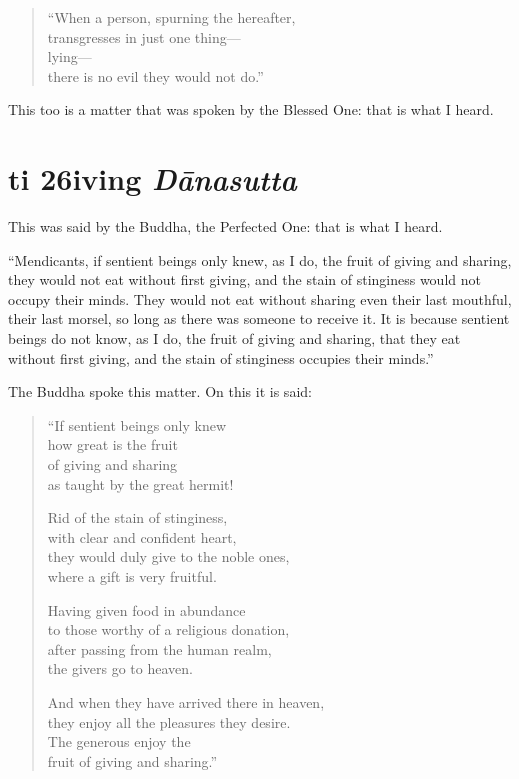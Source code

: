 \documentclass[12pt,openany]{book}%
\newcommand*{\suttatitleacronym}[1]{\smaller[2]{#1}\vspace*{.3em}}
\newcommand*{\suttatitletranslation}[1]{\linebreak{#1}}
\newcommand*{\suttatitleroot}[1]{\linebreak\smaller[2]\itshape{#1}}
\newcommand*{\tocacronym}[1]{\hspace*{-3.3em}{#1}\quad}
\newcommand*{\toctranslation}[1]{#1}
\newcommand*{\tocroot}[1]{(\textit{#1})}
\begin{document}
\begin{verse}%
“When a person, spurning the hereafter, \\
transgresses in just one thing—\\
lying—\\
there is no evil they would not do.” 

%
\end{verse}

This too is a matter that was spoken by the Blessed One: that is what I heard. 

%
\section*{{\suttatitleacronym Iti 26}{\suttatitletranslation Giving }{\suttatitleroot Dānasutta}}
\addcontentsline{toc}{section}{\tocacronym{Iti 26} \toctranslation{Giving } \tocroot{Dānasutta}}

This was said by the Buddha, the Perfected One: that is what I heard. 

“Mendicants, if sentient beings only knew, as I do, the fruit of giving and sharing, they would not eat without first giving, and the stain of stinginess would not occupy their minds. They would not eat without sharing even their last mouthful, their last morsel, so long as there was someone to receive it. It is because sentient beings do not know, as I do, the fruit of giving and sharing, that they eat without first giving, and the stain of stinginess occupies their minds.” 

The Buddha spoke this matter. On this it is said: 

\begin{verse}%
“If sentient beings only knew \\
how great is the fruit \\
of giving and sharing \\
as taught by the great hermit! 

Rid of the stain of stinginess, \\
with clear and confident heart, \\
they would duly give to the noble ones, \\
where a gift is very fruitful. 

Having given food in abundance \\
to those worthy of a religious donation, \\
after passing from the human realm, \\
the givers go to heaven. 

And when they have arrived there in heaven, \\
they enjoy all the pleasures they desire. \\
The generous enjoy the \\
fruit of giving and sharing.” 

%
\end{verse}
\end{document}
